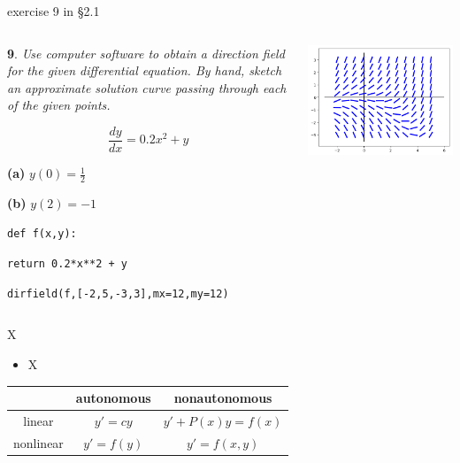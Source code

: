 \documentclass{beamer}
\begin{document}
\begin{frame}{exercise 9 in \S 2.1}

\begin{columns}
\begin{column}{0.45\textwidth}
\small
\noindent \textbf{9}.  \emph{Use computer software to obtain a direction field for the given differential equation.  By hand, sketch an approximate solution curve passing through each of the given points.}

$$\frac{dy}{dx} = 0.2 x^2 + y$$

\noindent \textbf{(a)} \quad $y(0)=\tfrac{1}{2}$

\noindent \textbf{(b)} \quad $y(2)=-1$

\vspace{10mm}

\tiny
\texttt{def f(x,y):}

\hspace{3mm} \texttt{return 0.2*x**2 + y}

\texttt{dirfield(f,[-2,5,-3,3],mx=12,my=12)}
\end{column}
\begin{column}{0.55\textwidth}

\hspace{-10mm} \includegraphics[width=1.15\textwidth]{figs/exercise-9-2-1}
\end{column}
\end{columns}

\end{frame}


\begin{frame}{X}

\begin{itemize}
\item X
\end{itemize}
\begin{tabular}{c|c|c}
 & autonomous & nonautonomous \\ \hline
linear \Large\strut & $y' = c y$ & $y' + P(x) y = f(x)$ \\ \hline
nonlinear \Large\strut & $y' = f(y)$ & $y'=f(x,y)$
\end{tabular}
\end{frame}
\end{document}
